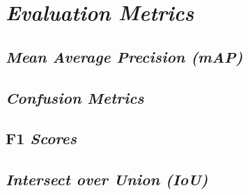 \section{\textit{Evaluation Metrics}}
\label{sec:evaluationmetrics}

\subsection{\textit{Mean Average Precision (mAP)}}
\label{subsec:meanaverageprecision}

\subsection{\textit{Confusion Metrics}}
\label{subsec:confusionmetrics}

\subsection{F1 \textit{Scores}}
\label{subsec:f1scores}

\subsection{\textit{Intersect over Union (IoU)}}
\label{subsec:intersectoverunion}


